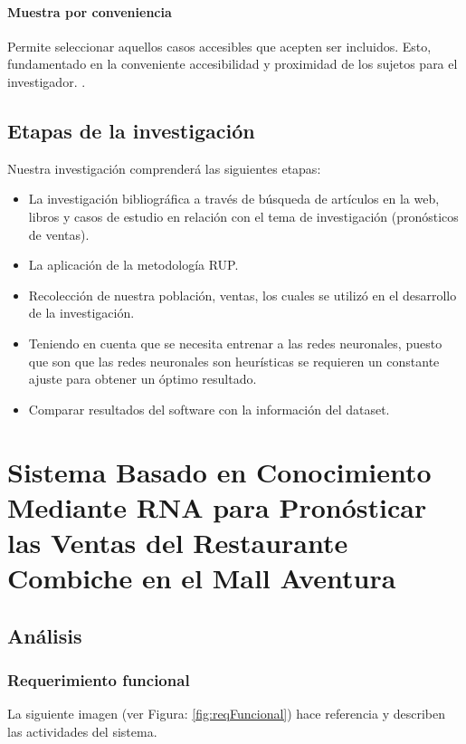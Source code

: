 \subsubsection{Muestra por conveniencia}
Permite seleccionar aquellos casos accesibles que acepten ser incluidos. Esto, fundamentado en la conveniente accesibilidad y proximidad de los sujetos para el investigador. \citep{otzen2017tecnicas}.

\section{Etapas de la investigación}
Nuestra investigación comprenderá  las siguientes etapas:
\begin{itemize}
\item La investigación bibliográfica a través de búsqueda de artículos en la web, libros y casos de estudio en relación con el tema de investigación (pronósticos de ventas).
\item La aplicación de la metodología RUP.
\item Recolección de nuestra población, ventas, los cuales se utilizó en el desarrollo de la investigación.
\item Teniendo en cuenta que se necesita entrenar a las redes neuronales, puesto que son  que las redes neuronales son heurísticas se requieren un constante ajuste para obtener un óptimo resultado.
\item Comparar resultados del software con la información del dataset.

\end{itemize}

\chapter{Sistema Basado en Conocimiento Mediante RNA para Pronósticar las Ventas del Restaurante Combiche en el Mall Aventura}
\renewcommand{\baselinestretch}{2} %

\section{Análisis}

\subsection{Requerimiento funcional}
La siguiente imagen (ver Figura: \ref{fig:reqFuncional}) hace referencia y describen las actividades del sistema.

